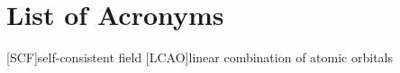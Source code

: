 
\chapter{List of Acronyms}

\begin{acronym}
    [SCF]{self-consistent field}
    [LCAO]{linear combination of atomic orbitals}
\end{acronym}
